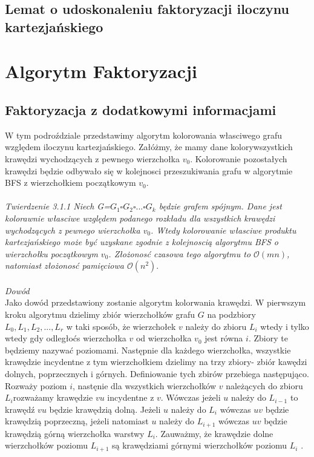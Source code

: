 \documentclass[12pt,a4paper,titlepage]{article}
\begin{document}
\subsection{Lemat o udoskonaleniu faktoryzacji iloczynu kartezjańskiego}
\newpage
\section{Algorytm Faktoryzacji}
\subsection{Faktoryzacja z dodatkowymi informacjami}
W tym podroździale przedstawimy algorytm kolorowania własciwego grafu względem iloczynu kartezjańskiego. Załóżmy, że mamy dane kolorywszystkich krawędzi wychodzących z pewnego wierzchołka $v_0$. Kolorowanie pozostałych krawędzi będzie odbywało się w kolejnosci przeszukiwania grafu w algorytmie BFS z wierzchołkiem początkowym $v_0$. \\
\\
\textit{Twierdzenie 3.1.1 Niech G=$G_1 \square G_2 \square ... \square G_k$ będzie grafem spójnym. Dane jest kolorawnie własciwe względem podanego rozkładu dla wszystkich krawędzi wychodzących z pewnego wierzchołka $v_0$. Wtedy  kolorowanie własciwe produktu kartezjańskiego może być uzyskane zgodnie z kolejnoscią algorytmu BFS o wierzchołku początkowym $v_0$. Złożonosć czasowa tego algorytmu to $\mathcal{O}(mn)$, natomiast złożonosć pamięciowa $\mathcal{O}(n^2)$}.\\
\\
\textit{Dowód}\\
Jako dowód przedstawiony zostanie algorytm kolorwania krawędzi. W pierwszym kroku algorytmu dzielimy zbiór wierzchołków grafu $G$ na podzbiory $L_0 , L_1, L_2 , ..., L_r$ w taki sposób, że wierzchołek $v$ należy do zbioru $L_i$ wtedy i tylko wtedy gdy odległoćs wierzchołka $v$ od wierzchołka $v_0$ jest równa $i$. Zbiory te będziemy nazywać poziomami. Następnie dla każdego wierzchołka, wszystkie krawędzie incydentne z tym wierzchołkiem dzielimy na trzy zbiory- zbiór kawędzi dolnych, poprzecznych i górnych. Definiowanie tych zbirów przebiega następująco. Rozważy poziom $i$, nastęnie dla wszystkich wierzchołków $v$ należących do zbioru $L_i$rozważamy krawędzie $vu$ incydentne z $v$. Wówczas jeżeli $u$ należy do $L_{i-1}$ to krawędź $vu$ będzie krawędzią dolną. Jeżeli $u$ należy do $L_i$ wówczas $uv$ będzie krawędzią poprzeczną, jeżeli natomiast $u$ należy do $L_{i+1}$ wówczas $uv$ będzie krawędzią górną wierzchołka warstwy $L_i$. Zauważmy, że krawędzie dolne wierzchołków poziomu $L_{i+1}$ są krawędziami górnymi wierzchołków poziomu $L_{i}$ .\\
\end{document}
